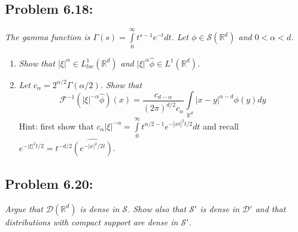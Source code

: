 \documentclass[letterpaper,twoside,11pt]{article}
\theoremstyle{mystyle}
\newcommand{\R}{{\mathbb R}}
\begin{document}
\subsection*{Problem 6.18:}
\textit{The gamma function is $\Gamma(s) = \displaystyle \int\limits_0^\infty t^{s-1}e^{-t}dt$. Let $\phi \in \mathcal S\left( \R^d \right)$ and $0 <\alpha <d$. }
\begin{enumerate}
  \item \textit{Show that $|\xi|^\alpha\in L_{loc}^1\left( \R^d \right)$ and $|\xi|^\alpha \hat \phi \in L^1\left( \R^d \right)$.}
  \item \textit{Let $c_\alpha = 2^{\alpha/2} \Gamma\left( \alpha/2 \right)$. Show that }
  \[\mathcal F^{-1} \left( |\xi|^{-\alpha} \hat \phi \right) (x) = \frac{c_{d-\alpha}}{\left( 2\pi \right)^{d/2}c_\alpha} \int\limits_{\R^d} |x-y|^{\alpha - d}\phi(y) dy  \] 
  Hint: first show that $c_\alpha |\xi|^{-\alpha} = \int\limits_0^\infty t^{\alpha/2-1} e^{-|xi|^2 t/2}dt$ and recall $e^{-|\xi|^2 t/2}=t^{-d/2}\hat{\left( e^{-|x|^2/2t} \right)}$. 
\end{enumerate}










\subsection*{Problem 6.20:}
\textit{Argue that $\mathcal D\left( \R^d \right)$ is dense in $\mathcal S$. Show also that $\mathcal S'$ is dense in $\mathcal D'$ and that distributions with compact support are dense in $\mathcal S'$. }
\end{document}

